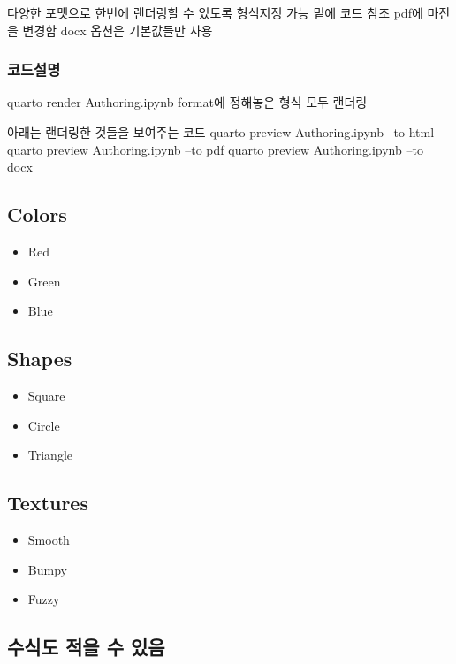 \documentclass[
  letterpaper,
  DIV=11,
  numbers=noendperiod]{scrartcl}
\providecommand{\tightlist}{%
  \setlength{\itemsep}{0pt}\setlength{\parskip}{0pt}}\usepackage{longtable,booktabs,array}
\begin{document}
다양한 포맷으로 한번에 랜더링할 수 있도록 형식지정 가능 밑에 코드 참조
pdf에 마진을 변경함 docx 옵션은 기본값들만 사용

\hypertarget{uxcf54uxb4dcuxc124uxba85}{%
\subsubsection{코드설명}\label{uxcf54uxb4dcuxc124uxba85}}

quarto render Authoring.ipynb format에 정해놓은 형식 모두 랜더링

아래는 랜더링한 것들을 보여주는 코드 quarto preview Authoring.ipynb --to
html quarto preview Authoring.ipynb --to pdf quarto preview
Authoring.ipynb --to docx

\hypertarget{colors}{%
\subsection{Colors}\label{colors}}

\begin{itemize}
\tightlist
\item
  Red
\item
  Green
\item
  Blue
\end{itemize}

\hypertarget{shapes}{%
\subsection{Shapes}\label{shapes}}

\begin{itemize}
\tightlist
\item
  Square
\item
  Circle
\item
  Triangle
\end{itemize}

\hypertarget{textures}{%
\subsection{Textures}\label{textures}}

\begin{itemize}
\tightlist
\item
  Smooth
\item
  Bumpy
\item
  Fuzzy
\end{itemize}

\hypertarget{uxc218uxc2dduxb3c4-uxc801uxc744-uxc218-uxc788uxc74c}{%
\subsection{수식도 적을 수
있음}\label{uxc218uxc2dduxb3c4-uxc801uxc744-uxc218-uxc788uxc74c}}
\end{document}
